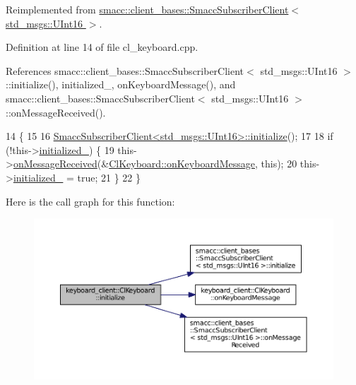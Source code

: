 Reimplemented from \hyperlink{classsmacc_1_1client__bases_1_1SmaccSubscriberClient_af188f0f5e89de26a07e1f964cdd23a70}{smacc\+::client\+\_\+bases\+::\+Smacc\+Subscriber\+Client$<$ std\+\_\+msgs\+::\+U\+Int16 $>$}.



Definition at line 14 of file cl\+\_\+keyboard.\+cpp.



References smacc\+::client\+\_\+bases\+::\+Smacc\+Subscriber\+Client$<$ std\+\_\+msgs\+::\+U\+Int16 $>$\+::initialize(), initialized\+\_\+, on\+Keyboard\+Message(), and smacc\+::client\+\_\+bases\+::\+Smacc\+Subscriber\+Client$<$ std\+\_\+msgs\+::\+U\+Int16 $>$\+::on\+Message\+Received().


\begin{DoxyCode}
14                             \{
15 
16   \hyperlink{classsmacc_1_1client__bases_1_1SmaccSubscriberClient_af188f0f5e89de26a07e1f964cdd23a70}{SmaccSubscriberClient<std\_msgs::UInt16>::initialize}();
17 
18   \textcolor{keywordflow}{if} (!this->\hyperlink{classkeyboard__client_1_1ClKeyboard_aff74d4f212f4846a1f7cc6c0e4d5f728}{initialized\_}) \{
19     this->\hyperlink{classsmacc_1_1client__bases_1_1SmaccSubscriberClient_a4f02251e3a161fb6d802b154b1081f18}{onMessageReceived}(&\hyperlink{classkeyboard__client_1_1ClKeyboard_adbfb9c2b98f784b12cf7740b4e861d8e}{ClKeyboard::onKeyboardMessage}, \textcolor{keyword}{
      this});
20     this->\hyperlink{classkeyboard__client_1_1ClKeyboard_aff74d4f212f4846a1f7cc6c0e4d5f728}{initialized\_} = \textcolor{keyword}{true};
21   \}
22 \}
\end{DoxyCode}


Here is the call graph for this function\+:
\nopagebreak
\begin{figure}[H]
\begin{center}
\leavevmode
\includegraphics[width=350pt]{classkeyboard__client_1_1ClKeyboard_a7ac4502969c62b0c836b531cec05f8ed_cgraph}
\end{center}
\end{figure}


